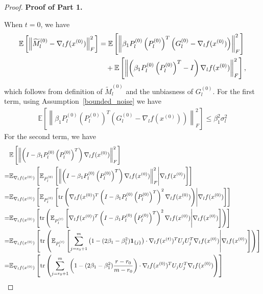 \begin{proof}

{\bf Proof of Part 1.}

When $t=0$, we have 
\begin{align}
\mathbb{E}\left [ \left \| \tilde {M}_l^{(0)} -\nabla _lf(x^{(0)})\right \|_F^2  \right ]
&= \mathbb{E}\left [ \left \| \beta_1P_l^{(0)}\left(P_l^{(0)}\right)^T\left(G_l^{(0)}-\nabla _lf(x^{(0)})\right) \right \|_F^2  \right ]\notag\\
&\quad + \mathbb{E}\left [ \left \| \left(\beta_1P_l^{(0)}\left(P_l^{(0)}\right)^T-I\right)\nabla _lf(x^{(0)}) \right \|_F^2  \right ],
\end{align}
which follows from definition of $\tilde{M}_l^{(0)}$ and the unbiasness of $G_l^{(0)}$. 
For the first term, using Assumption~\ref{bounded_noise} we have
\begin{align}
    \mathbb{E}\left [ \left \| \beta_1P_l^{(0)}\left(P_l^{(0)}\right)^T\left(G_l^{(0)}-\nabla _lf(x^{(0)})\right) \right \|_F^2  \right ]\le\beta_1^2\sigma_l^2\label{0_first}
\end{align}
For the second term, we have
\begin{align} \label{0_seconf_last}
&\mathbb{E}\left [ \left \| \left(I - \beta_1P_l^{(0)}\left(P_l^{(0)}\right)^T\right)\nabla_lf(x^{(0)}) \right \|_F^2  \right ] \notag\\
=&\mathbb{E}_{\nabla_{l}f(x^{(0)})}\left [ \mathbb{E}_{P_l^{(0)}}\left [   \left \| \left(I - \beta_1P_l^{(0)}\left(P_l^{(0)}\right)^T\right)\nabla_lf(x^{(0)}) \right \|_F^2 \middle|  \nabla_lf(x^{(0)})  \right ] \right ] \notag\\
=&\mathbb{E}_{\nabla_{l}f(x^{(0)})}\left [ \mathbb{E}_{P_l^{(0)}}\left [  \mathrm{tr} \left(\nabla_lf(x^{(0)})^T\left(I - \beta_1P_l^{(0)}\left(P_l^{(0)}\right)^T\right)^2\nabla_lf(x^{(0)}) \right) \middle|  \nabla_lf(x^{(0)})  \right ] \right ] \notag\\
=&\mathbb{E}_{\nabla_{l}f(x^{(0)})}\left [   \mathrm{tr} \left(\mathbb{E}_{P_l^{(t)}}\left [\nabla_lf(x^{(0)})^T\left(I - \beta_1P_l^{(0)}\left(P_l^{(0)}\right)^T\right)^2\nabla_lf(x^{(0)})  \middle|  \nabla_lf(x^{(0)})  \right ]\right) \right ] \notag\\
=&\mathbb{E}_{\nabla_{l}f(x^{(0)})}\left [   \mathrm{tr} \left(\mathbb{E}_{P_l^{(t)}}\left [\sum_{j=r_0+1}^{m}\left(1-(2\beta_1-\beta_1^2)\mathbf{1}_{\{j\}}\right)\cdot \nabla_lf(x^{(t)})^T U_jU_j^T\nabla_lf(x^{(0)})  \middle|  \nabla_lf(x^{(0)})  \right ]\right) \right ] \notag\\
=&\mathbb{E}_{\nabla_{l}f(x^{(0)})}\left [   \mathrm{tr} \left(\sum_{j=r_0+1}^{m}\left(1-(2\beta_1-\beta_1^2)\frac{r-r_0}{m-r_0}\right) \cdot \nabla_lf(x^{(0)})^T U_jU_j^T\nabla_lf(x^{(0)}) \right) \right ] \notag\\

\end{align}
\end{proof}
